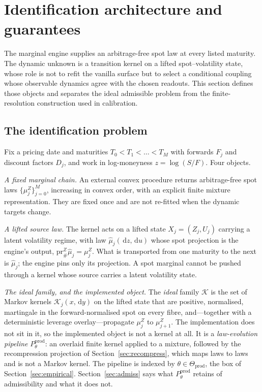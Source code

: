 \documentclass[11pt]{article}
\newcommand{\cK}{\mathcal{K}}
\providecommand{\pr}{\mathrm{pr}}
\providecommand{\Kfam}{\mathcal{K}}
\providecommand{\1}{\mathbf 1}
\newcommand{\dd}{\,\mathrm{d}}
\begin{document}
\section{Identification architecture and guarantees}
\label{sec:architecture}


The marginal engine supplies an arbitrage-free spot law at every listed maturity. The dynamic
unknown is a transition kernel on a lifted spot--volatility state, whose role is not to refit the
vanilla surface but to select a conditional coupling whose observable dynamics agree with the chosen
readouts. This section defines those objects and separates the ideal admissible problem from the
finite-resolution construction used in calibration.

\subsection{The identification problem}

Fix a pricing date and maturities $T_0<T_1<\dots<T_M$ with forwards $F_j$ and discount
factors $D_j$, and work in log-moneyness $z=\log(S/F)$. Four objects.

\emph{A fixed marginal chain.} An external convex procedure returns arbitrage-free spot
laws $\{\mu^Z_j\}_{j=0}^{M}$, increasing in convex order, with an explicit finite mixture
representation. They are fixed once and are not re-fitted when the dynamic targets change.

\emph{A lifted source law.} The kernel acts on a lifted state $X_j=(Z_j,U_j)$ carrying a
latent volatility regime, with law $\widehat\mu_j(\dd z,\dd u)$ whose spot projection is
the engine's output, $\pr^Z_{\#}\widehat\mu_j=\mu^Z_j$. What is transported from one
maturity to the next is $\widehat\mu_j$; the engine pins only its projection. A spot
marginal cannot be pushed through a kernel whose source carries a latent volatility state.

\emph{The ideal family, and the implemented object.} The \emph{ideal} family $\Kfam$ is the set of Markov kernels
$\cK_j(x,\dd y)$ on the lifted state that are positive, normalised, martingale in the
forward-normalised spot on every fibre, and---together with a deterministic leverage
overlay---propagate $\mu^Z_j$ to $\mu^Z_{j+1}$. The implementation does not sit in it, so the
implemented object is not a kernel at all. It is a \emph{law-evolution pipeline}
$P^{\mathrm{prod}}_\theta$: an overlaid finite kernel applied to a mixture, followed by the
recompression projection of Section~\ref{sec:recompress}, which maps laws to laws and is not a
Markov kernel. The pipeline is indexed by $\theta\in\Theta_{\mathrm{prod}}$, the box of
Section~\ref{sec:empirical}. Section~\ref{sec:admiss} says what $P^{\mathrm{prod}}_\theta$ retains
of admissibility and what it does not.
\end{document}

